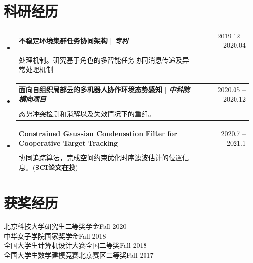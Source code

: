 \documentclass[a4paper,11pt]{ctexart}
\makeatletter
\newcommand{\CVItem}[1]{
	\item\small{
		{#1 \vspace{-2pt}}
	}
}
\newcommand{\CVSubheading}[4]{
	\vspace{-2pt}\item
	\begin{tabular*}{0.97\textwidth}[t]{l@{\extracolsep{\fill}}r}
		\textbf{#1} & #2 \\
		\small#3 & \small #4 \\
	\end{tabular*}\vspace{-7pt}
}
\newcommand{\CVSubHeadingListStart}{\begin{itemize}[leftmargin=0.5cm, label={}]}
\newcommand{\CVSubHeadingListEnd}{\end{itemize}}
\newcommand{\CVItemListStart}{\begin{itemize}}
\newcommand{\CVItemListEnd}{\end{itemize}\vspace{-5pt}}
\makeatother
\begin{document}
	\section{科研经历}
	\CVSubHeadingListStart
	\CVSubheading
	{不稳定环境集群任务协同架构 $|$ \emph{\small{专利}}}{2019.12 -- 2020.04}
	{\makecell[l]{\hspace{2em}构建基于角色的多智能体协同模型体系，建立多智能体间通用的分布式自适应的协同任务\\
		处理机制。研究基于角色的多智能任务协同消息传递及异常处理机制}}{}
	\CVSubheading
	{面向自组织局部云的多机器人协作环境态势感知 $|$ \emph{\small{中科院横向项目}}}{2020.05 -- 2020.12}
	{\makecell[l]{\hspace{2em}搭建面向云环境的多机器人自组织协同架构，研究云服务技术下的协同框架，支持协同\\
			态势冲突检测和消解以及失效情况下的重组。}}{}
	\CVSubheading
	{\small\textbf{Constrained Gaussian Condensation Filter for Cooperative Target Tracking} }{2020.7 -- 2021.1}
	{\makecell[l]{\hspace{2em}基于时空约束高斯聚合滤波的协同运动追踪，提出一种基于时空约束高斯聚合滤波的多目标\\
			协同追踪算法，完成空间约束优化时序滤波估计的位置信息。(\textbf{SCI论文在投})}}{}
	\CVSubHeadingListEnd
	
	

	
	\section{获奖经历}
	{北京科技大学研究生二等奖学金}\hfill{Fall 2020}\\
	{中华女子学院国家奖学金}\hfill{Fall 2018} \\
	{全国大学生计算机设计大赛全国二等奖}\hfill{Fall 2018} \\
	{全国大学生数学建模竞赛北京赛区二等奖}\hfill{Fall 2017}\\

	

	
\end{document}
